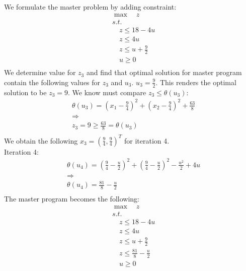 \documentclass[12pt]{article}
\begin{document}
    We formulate the master problem by adding constraint:
    \begin{align*}
        & \max \quad z\\
        &s.t.\\
        &\quad z\leq 18 - 4u\\
        &\quad z \leq 4u\\
        &\quad z \leq u + \frac{9}{2}\\
        &\quad u \geq 0\\
    \end{align*}
    We determine value for $z_3$ and find that optimal solution for master program contain the following values for $z_3$ and $u_3$. $u_3 = \frac{9}{2} $. This renders the optimal solution to be $z_3 = 9$. We know must compare $z_3 \leq \theta(u_3)$:\\
        \begin{align*}
            &\theta(u_3) = (x_1 - \frac{9}{4})^2 + (x_2 - \frac{9}{4})^2 + \frac{63}{8}\\
            &\Rightarrow\\
            &z_3 = 9 \geq \frac{63}{8} = \theta(u_3)\\
        \end{align*}
    We obtain the following $x_3 = (\frac{9}{4}, \frac{9}{4})^T$ for iteration 4.\\
    Iteration 4:\\
        \begin{align*}
            &\theta(u_4) = (\frac{9}{4} - \frac{u}{2})^2 + (\frac{9}{4} - \frac{u}{2})^2 - \frac{u^2}{2} + 4u\\
            &\Rightarrow\\
            &\theta(u_4) = \frac{81}{8} - \frac{u}{2}\\
        \end{align*}
    The master program becomes the following: \\
    \begin{align*}
        & \max \quad z\\
        &s.t.\\
        &\quad z\leq 18 - 4u\\
        &\quad z \leq 4u\\
        &\quad z \leq u + \frac{9}{2}\\
        &\quad z \leq \frac{81}{8} - \frac{u}{2}\\
        &\quad u \geq 0\\
    \end{align*}
\end{document}
